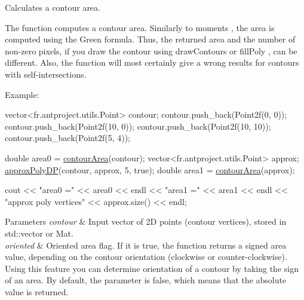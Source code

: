 Calculates a contour area. 

The function computes a contour area. Similarly to moments , the area is computed using the Green formula. Thus, the returned area and the number of non-\/zero pixels, if you draw the contour using draw\+Contours or fill\+Poly , can be different. Also, the function will most certainly give a wrong results for contours with self-\/intersections. 

Example\+: 
\begin{DoxyPre}
\begin{DoxyCode}
vector<fr.antproject.utils.Point> contour;
contour.push\_back(Point2f(0, 0));
contour.push\_back(Point2f(10, 0));
contour.push\_back(Point2f(10, 10));
contour.push\_back(Point2f(5, 4));

\textcolor{keywordtype}{double} area0 = \hyperlink{group__imgproc__shape_ga5de110872b0023d4176fcc7c3f2c6115}{contourArea}(contour);
vector<fr.antproject.utils.Point> approx;
\hyperlink{group__imgproc__shape_ga59b2a13c4f741e0898f8415d9436d8a0}{approxPolyDP}(contour, approx, 5, \textcolor{keyword}{true});
\textcolor{keywordtype}{double} area1 = \hyperlink{group__imgproc__shape_ga5de110872b0023d4176fcc7c3f2c6115}{contourArea}(approx);

cout << \textcolor{stringliteral}{"area0 ="} << area0 << endl <<
        \textcolor{stringliteral}{"area1 ="} << area1 << endl <<
        \textcolor{stringliteral}{"approx poly vertices"} << approx.size() << endl;
\end{DoxyCode}
 \end{DoxyPre}
 
\begin{DoxyParams}{Parameters}
{\em contour} & Input vector of 2D points (contour vertices), stored in std\+::vector or Mat. \\
\hline
{\em oriented} & Oriented area flag. If it is true, the function returns a signed area value, depending on the contour orientation (clockwise or counter-\/clockwise). Using this feature you can determine orientation of a contour by taking the sign of an area. By default, the parameter is false, which means that the absolute value is returned. \\
\hline
\end{DoxyParams}
\mbox{\label{group__imgproc__shape_gad55038a508ccdb2a51346a9321039983}} 
